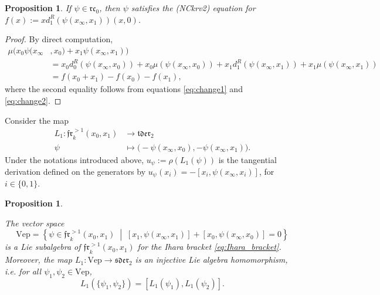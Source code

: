 \documentclass[a4paper,fleqn]{cas-sc}
\newtheorem{proposition}[theorem]{Proposition}
\newcommand{\frone}{\mathfrak{fr}^{>1}_k(x_0,x_1)}
\begin{document}
\begin{proposition}\label{prop:noncommutativekrv2}
If $\psi\in \mathfrak{rc}_0$,
then $\psi$ satisfies the (NCkrv2) equation %
for $f(x):=xd^R_1(\psi(x_\infty,x_1))(x,0)$.
\end{proposition}

\begin{proof}
	By direct computation,
	\begin{align*}
		\mu(x_0\psi(x_\infty &,x_0)+x_1\psi(x_\infty,x_1))\\
		&=x_0d^R_0(\psi(x_\infty,x_0))+x_0\mu(\psi(x_\infty,x_0)) +x_1d^R_1(\psi(x_\infty,x_1))+x_1\mu(\psi(x_\infty,x_1))\\
		&=f(x_0+x_1)-f(x_0)-f(x_1),
	\end{align*}
	where the second equality follows from equations \eqref{eq:change1} and \eqref{eq:change2}.
\end{proof}

Consider the map
\begin{align*}
    L_1: \mathfrak{fr}^{>1}_k(x_0,x_1) & \to \mathfrak{tder}_2 \\
    \psi & \mapsto \bigl(
-\psi(x_\infty,x_0),
-\psi(x_\infty,x_1)
\bigr).
\end{align*}
Under the notations introduced above, \(u_\psi:=\rho(L_1(\psi))\) is the tangential derivation defined on the generators by $u_\psi(x_i)
=-[x_i,\psi(x_\infty,x_i)]$, for $i\in \{0,1\}.$

\begin{proposition}\label{prop:Hex-Lie-subalgebra}


The vector space
\[
\mathrm{Vep}
=
\left\{
\psi\in\mathfrak{fr}^{>1}_k(x_0,x_1)
\;\middle|\;
[x_1,\psi(x_\infty,x_1)]
+
[x_0,\psi(x_\infty,x_0)]
=0
\right\}
\]
is a Lie subalgebra of $\frone$ for the Ihara bracket \eqref{eq:Ihara_bracket}.
Moreover, the map
$L_1:
\mathrm{Vep}\to\mathfrak{sder}_2$ is an injective Lie algebra homomorphism, %
i.e. for all \(\psi_1,\psi_2\in\mathrm{Vep}\),
\[
L_1(\{\psi_1,\psi_2\}) = [L_1(\psi_1),L_1(\psi_2)].
\]
\end{proposition}
\end{document}
